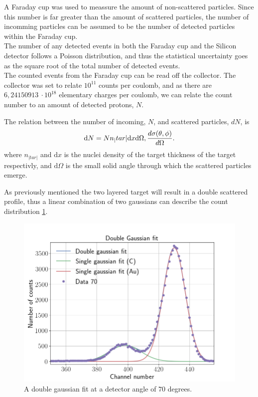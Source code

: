 A Faraday cup was used to meassure the amount of non-scattered particles. 
Since this number is far greater than the amount of scattered particles, the number of incomming particles can be assumed to be the number of detected particles within the Faraday cup.\\

The number of any detected events in both the Faraday cup and the Silicon detector follows a Poisson
distribution, and thus the statistical uncertainty goes as the square root of the total number of detected events.\\

The counted events from the Faraday cup can be read off the collector. 
The collector was set to relate $10^{11}$ counts per coulomb, and as there are $6,24150913\ \cdot10^{18}$ elementary
charges per coulomb, we can relate the count number to an amount of detected
protons, $N$.

The relation between the number of incoming, $N$, and scattered particles, $dN$, is
\begin{equation}\label{eq:dN}
    \mathrm{d}N = N n_|tar| \mathrm{d}x \mathrm{d}\Omega,
    \diff[d]{\sigma(\theta,\phi)}{\Omega}.
\end{equation}
where $n_|tar|$ and $\mathrm{d}x$ is the nuclei density of the target thickness of the target respectivly, and $\mathrm{d}\Omega$ is the small solid angle through which the scattered particles emerge.

As previously mentioned  the two layered target will result in a double scattered profile, thus a linear combination of two gaussians can describe the count distribution \cref{fig_doublegauss}.\\
\begin{figure}[h]
\centering
\includegraphics[width=0.99\columnwidth]{Data_70}
\caption{A double gaussian fit at a detector angle of $70$ degrees.}
\label{fig_doublegauss}
\end{figure}

